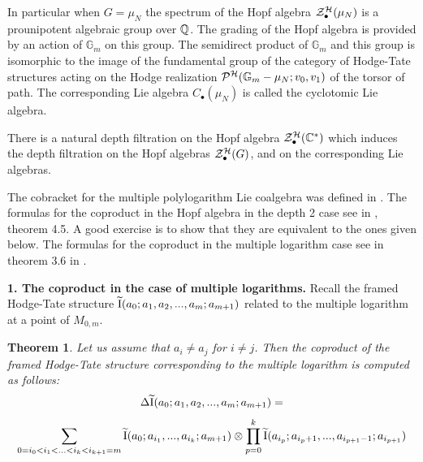 \documentclass[10pt]{article}
\newtheorem{theorem}{Theorem}[section]
\begin{document}
In particular when $G = \mu_N$ the  spectrum 
of the Hopf algebra ${\cal Z}^{\cal H}_{\bullet}(\mu_N)$ 
is a prounipotent algebraic group over ${\mathbb Q}$. 
The grading of the Hopf algebra is provided  
by an action of ${\mathbb G}_m$ on this group. 
The semidirect product of ${\mathbb G}_m$ and this 
group is isomorphic to 
the image of the  fundamental group of the category of Hodge-Tate structures 
acting on the Hodge realization ${\cal P}^{{\cal H}}({\mathbb G}_m - \mu_N; v_0, v_{1})$
 of the  
torsor of path.  
The corresponding Lie algebra ${C}_{\bullet}(\mu_N)$ is called the 
 cyclotomic Lie algebra. 

There is a  natural depth filtration on the  Hopf algebra  
${\cal Z}^{\cal H}_{\bullet}({\mathbb C}^*)$ which induces the depth filtration on the 
Hopf algebras ${\cal Z}^{\cal H}_{\bullet}(G)$, and on the corresponding Lie algebras. 

The cobracket 
for the  multiple polylogarithm Lie coalgebra 
was defined in \cite{G0}. The formulas for the coproduct in the Hopf algebra 
in the depth 2 case see in \cite{G2}, theorem 4.5. A good exercise is to show that 
they are equivalent to the ones given below.  The formulas for the coproduct 
 in the multiple logarithm 
case see in theorem 3.6 in \cite{G5}. 


{\bf 1. The coproduct in the case of multiple logarithms.} 
Recall the framed 
Hodge-Tate structure
${\widetilde {\rm I}}(a_0; a_1, a_2, ..., a_m; a_{m+1})$  related to the multiple logarithm 
at a point of $M_{0,m}$. 

\begin{theorem} \label{CP1} Let us assume that $a_i \not = a_j$ for $i \not = j$. 
Then the coproduct of the framed Hodge-Tate structure corresponding to the multiple 
logarithm is computed as follows: 
\begin{equation} \label{CP2}
\Delta {\widetilde {\rm I}}(a_0; a_1, a_2, ..., a_m; a_{m+1})= 
\end{equation}
$$
\sum_{0 = i_0 < i_1 < ... < i_k < i_{k+1} = m} {\widetilde {\rm I}}(a_0; a_{i_1}, ..., 
a_{i_k}; a_{m+1}) \otimes \prod_{p =0 }^k
{\widetilde {\rm I}}(a_{i_{p}}; a_{i_{p}+1}, ..., a_{i_{p+1}-1}; a_{i_{p+1}})
$$
\end{theorem}
\end{document}
